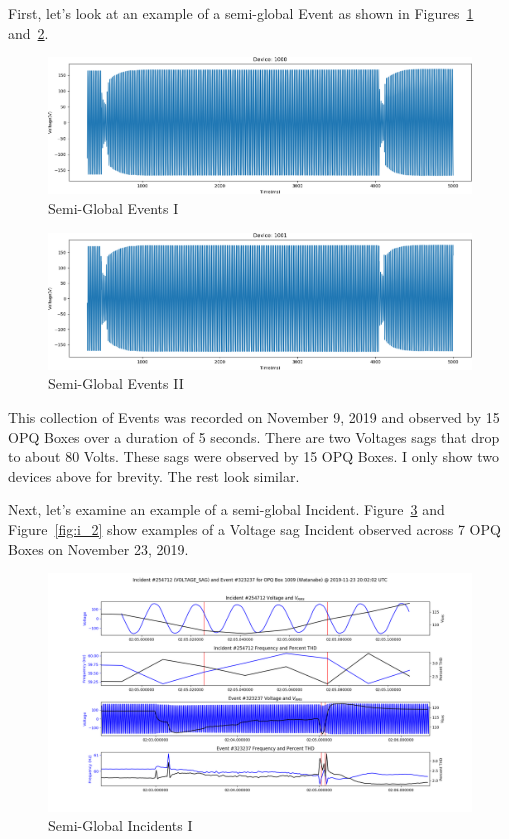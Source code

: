 First, let's look at an example of a semi-global Event as shown in Figures~\ref{fig:sg_events} and~\ref{fig:sg_events_1}.

\begin{figure}[H]
    \centering
    \includegraphics[width=\linewidth]{figures/events_1.png}
    \caption{Semi-Global Events I}
    \label{fig:sg_events}
\end{figure}

\begin{figure}[H]
    \centering
    \includegraphics[width=\linewidth]{figures/events_2.png}
    \caption{Semi-Global Events II}
    \label{fig:sg_events_1}
\end{figure}

This collection of Events was recorded on November 9, 2019 and observed by 15 OPQ Boxes over a duration of 5 seconds. There are two Voltages sags that drop to about 80 Volts.  These sags were observed by 15 OPQ Boxes. I only show two devices above for brevity. The rest look similar.

Next, let's examine an example of a semi-global Incident. Figure~\ref{fig:i_1} and Figure~\ref{fig:i_2} show examples of a Voltage sag Incident observed across 7 OPQ Boxes on November 23, 2019.

\begin{figure}[H]
    \centering
    \includegraphics[width=\linewidth]{figures/vsag_g_1.png}
    \caption{Semi-Global Incidents I}
    \label{fig:i_1}
\end{figure}

